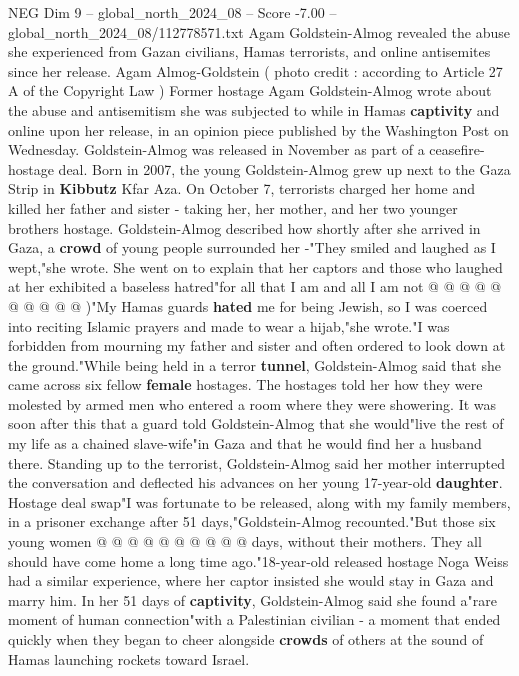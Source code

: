 \begin{textsample}{NEG Dim 9 – global\_north\_2024\_08 – Score -7.00 – global\_north\_2024\_08/112778571.txt}  \label{ex:f9_neg_090}
Agam Goldstein-Almog revealed the abuse she experienced from Gazan civilians, Hamas terrorists, and online antisemites since her release.
Agam Almog-Goldstein ( photo credit : according to Article 27 A of the Copyright Law ) Former hostage Agam Goldstein-Almog wrote about the abuse and antisemitism she was subjected to while in Hamas \textbf{captivity} and online upon her release, in an opinion piece published by the Washington Post on Wednesday.
Goldstein-Almog was released in November as part of a ceasefire-hostage deal.
Born in 2007, the young Goldstein-Almog grew up next to the Gaza Strip in \textbf{Kibbutz} Kfar Aza.
On October 7, terrorists charged her home and killed her father and sister - taking her, her mother, and her two younger brothers hostage.
Goldstein-Almog described how shortly after she arrived in Gaza, a \textbf{crowd} of young people surrounded her -"They smiled and laughed as I wept,"she wrote.
She went on to explain that her captors and those who laughed at her exhibited a baseless hatred"for all that I am and all I am not @ @ @ @ @ @ @ @ @ @ )"My Hamas guards \textbf{hated} me for being Jewish, so I was coerced into reciting Islamic prayers and made to wear a hijab,"she wrote."I was forbidden from mourning my father and sister and often ordered to look down at the ground."While being held in a terror \textbf{tunnel}, Goldstein-Almog said that she came across six fellow \textbf{female} hostages.
The hostages told her how they were molested by armed men who entered a room where they were showering.
It was soon after this that a guard told Goldstein-Almog that she would"live the rest of my life as a chained slave-wife"in Gaza and that he would find her a husband there.
Standing up to the terrorist, Goldstein-Almog said her mother interrupted the conversation and deflected his advances on her young 17-year-old \textbf{daughter}.
Hostage deal swap"I was fortunate to be released, along with my family members, in a prisoner exchange after 51 days,"Goldstein-Almog recounted."But those six young women @ @ @ @ @ @ @ @ @ @ days, without their mothers.
They all should have come home a long time ago."18-year-old released hostage Noga Weiss had a similar experience, where her captor insisted she would stay in Gaza and marry him.
In her 51 days of \textbf{captivity}, Goldstein-Almog said she found a"rare moment of human connection"with a Palestinian civilian - a moment that ended quickly when they began to cheer alongside \textbf{crowds} of others at the sound of Hamas launching rockets toward Israel.

\end{textsample}
